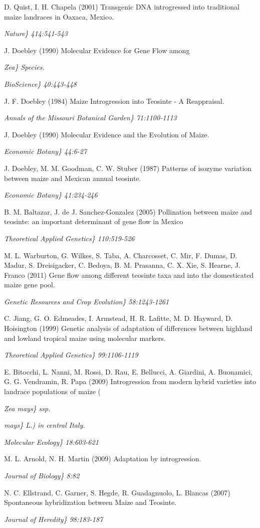 \documentclass[11pt]{article}
\begin{document}
{\begin{thebibliography}{1}
{{{{ D. Quist, I. H. Chapela (2001)
Transgenic DNA introgressed into traditional maize landraces in Oaxaca, Mexico.
{\em Nature\} 414:541-543

 J. Doebley (1990)
Molecular Evidence for Gene Flow among {\em Zea\} Species.
{\em BioScience\} 40:443-448

 J. F. Doebley (1984)
Maize Introgression into Teosinte - A Reappraisal.
{\em Annals of the Missouri Botanical Garden\} 71:1100-1113

 J. Doebley (1990)
Molecular Evidence and the Evolution of Maize.
{\em Economic Botany\} 44:6-27

 J. Doebley, M. M. Goodman, C. W. Stuber (1987)
Patterns of isozyme variation between maize and Mexican annual teosinte.
{\em Economic Botany\} 41:234-246

 B. M. Baltazar, J. de J. Sanchez-Gonzalez (2005)
Pollination between maize and teosinte: an important determinant of gene flow in Mexico
{\em Theoretical Applied Genetics\} 110:519-526

 M. L. Warburton, G. Wilkes, S. Taba, A. Charcosset, C. Mir, F. Dumas, D. Madur, S. Dreisigacker, C. Bedoya, B. M. Prasanna, C. X. Xie, S. Hearne, J. Franco (2011)
Gene flow among different teosinte taxa and into the domesticated maize gene pool.
{\em Genetic Resources and Crop Evolution\} 58:1243-1261

 C. Jiang, G. O. Edmeades, I. Armstead, H. R. Lafitte, M. D. Hayward, D. Hoisington (1999)
Genetic analysis of adaptation of differences between highland and lowland tropical maize using molecular markers.
{\em Theoretical Applied Genetics\} 99:1106-1119

 E. Bitocchi, L. Nanni, M. Rossi, D. Rau, E. Bellucci, A. Giardini, A. Buonamici, G. G. Vendramin, R. Papa (2009)
Introgression from modern hybrid varieties into landrace populations of maize ({\em Zea mays\} ssp. {\em mays\} L.) in central Italy.
{\em Molecular Ecology\} 18:603-621

 M. L. Arnold, N. H. Martin (2009)
Adaptation by introgression.
{\em Journal of Biology\} 8:82

 N. C. Ellstrand, C. Garner, S. Hegde, R. Guadagnuolo, L. Blancas (2007)
Spontaneous hybridization between Maize and Teosinte.
{\em Journal of Heredity\} 98:183-187

}}}}}}}}}}}}}}}}}}
\end{thebibliography}}
\end{document}
